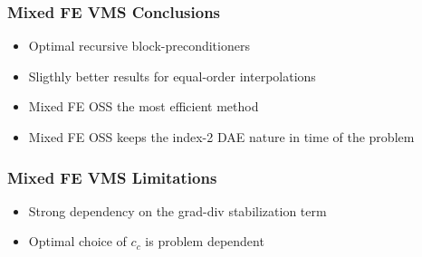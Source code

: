 \begin{frame}
\frametitle{Mixed FE VMS Conclusions}
\vfill
\begin{itemize}
\item<1-> Optimal recursive block-preconditioners
\item<2-> Sligthly better results for equal-order interpolations
\item<3-> Mixed FE OSS the most efficient method
\item<4-> Mixed FE OSS keeps the index-2 DAE nature in time of the problem
\end{itemize}
\vfill
\end{frame}
\begin{frame}
\frametitle{Mixed FE VMS Limitations}
\vfill
\begin{itemize}
\item<1-> Strong dependency on the grad-div stabilization term
\item<2-> Optimal choice of $ c_c $ is problem dependent
\end{itemize}
\vfill
\end{frame}